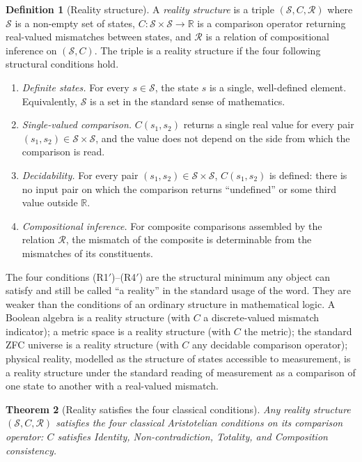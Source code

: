 \documentclass[11pt,a4paper]{article}
\newtheorem{theorem}{Theorem}
\theoremstyle{definition}
\newtheorem{definition}[theorem]{Definition}
\theoremstyle{remark}
\begin{document}
\begin{definition}[Reality structure]\label{def:reality-structure}
A \emph{reality structure} is a triple $(\mathcal{S}, C, \mathcal{R})$
where $\mathcal{S}$ is a non-empty set of states,
$C : \mathcal{S} \times \mathcal{S} \to \mathbb{R}$ is a comparison
operator returning real-valued mismatches between states, and
$\mathcal{R}$ is a relation of compositional inference on
$(\mathcal{S}, C)$. The triple is a reality structure if the four
following structural conditions hold.
\begin{enumerate}[label=(R\arabic*'),leftmargin=*]
\item \emph{Definite states.} For every $s \in \mathcal{S}$, the state
$s$ is a single, well-defined element. Equivalently, $\mathcal{S}$ is
a set in the standard sense of mathematics.
\item \emph{Single-valued comparison.} $C(s_1, s_2)$ returns a single
real value for every pair $(s_1, s_2) \in \mathcal{S} \times
\mathcal{S}$, and the value does not depend on the side from which the
comparison is read.
\item \emph{Decidability.} For every pair $(s_1, s_2) \in \mathcal{S}
\times \mathcal{S}$, $C(s_1, s_2)$ is defined: there is no input pair
on which the comparison returns ``undefined'' or some third value
outside $\mathbb{R}$.
\item \emph{Compositional inference.} For composite comparisons
assembled by the relation $\mathcal{R}$, the mismatch of the composite
is determinable from the mismatches of its constituents.
\end{enumerate}
\end{definition}

The four conditions (R1$'$)--(R4$'$) are the structural minimum any
object can satisfy and still be called ``a reality'' in the standard
usage of the word. They are weaker than the conditions of an ordinary
structure in mathematical logic. A Boolean algebra is a reality
structure (with $C$ a discrete-valued mismatch indicator); a metric
space is a reality structure (with $C$ the metric); the standard
ZFC universe is a reality structure (with $C$ any decidable
comparison operator); physical reality, modelled as the structure of
states accessible to measurement, is a reality structure under the
standard reading of measurement as a comparison of one state to
another with a real-valued mismatch.

\begin{theorem}[Reality satisfies the four classical conditions]
\label{thm:reality-satisfies-logic}
Any reality structure $(\mathcal{S}, C, \mathcal{R})$ satisfies the
four classical Aristotelian conditions on its comparison operator: $C$
satisfies Identity, Non-contradiction, Totality, and Composition
consistency.
\end{theorem}
\end{document}
